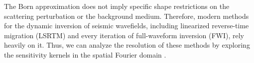 The Born approximation does not imply specific shape restrictions on the scattering 
perturbation or the background medium. Therefore, modern methods for the dynamic 
inversion of seismic wavefields, including linearized reverse-time migration 
(LSRTM) and every iteration of full-waveform inversion (FWI), rely heavily on it. 
Thus, we can analyze the resolution of these methods by exploring the 
sensitivity kernels in the spatial Fourier domain \citep[e.g.,][]{devaney1984,wu:11,mora1989,sirgue2004,kazei2013gp,kazei2013spectral,podgornova,kazei2017}.




 

